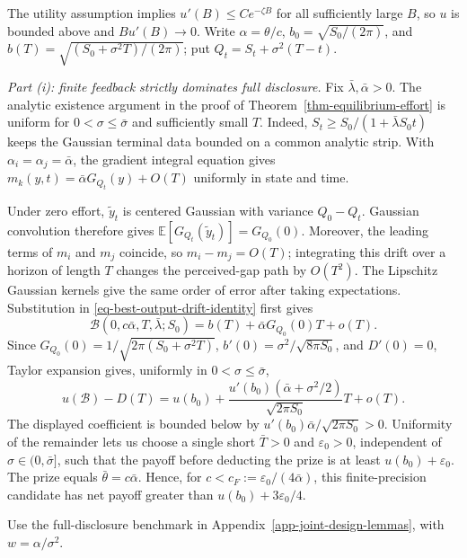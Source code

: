\documentclass[mnsc]{informs3}
\begin{document}
\begin{APPENDICES}
{
The utility assumption implies $u'(B)\leq C e^{-\zeta B}$ for all sufficiently
large $B$, so $u$ is bounded above and $Bu'(B)\to0$.
Write $\alpha=\theta/c$, $b_0=\sqrt{S_0/(2\pi)}$, and
$b(T)=\sqrt{(S_0+\sigma^2T)/(2\pi)}$; put
$Q_t=S_t+\sigma^2(T-t)$.

\emph{Part (i): finite feedback strictly dominates full disclosure.}
Fix $\bar\lambda,\bar\alpha>0$. The analytic existence argument in the
proof of Theorem~\ref{thm-equilibrium-effort} is uniform for
$0<\sigma\leq\bar\sigma$ and sufficiently small $T$.
Indeed, $S_t\geq S_0/(1+\bar\lambda S_0t)$ keeps the Gaussian terminal
data bounded on a common analytic strip. With $\alpha_i=\alpha_j=\bar\alpha$,
the gradient integral equation gives
$m_k(y,t)=\bar\alpha G_{Q_t}(y)+O(T)$ uniformly in state and time.

Under zero effort, $\tilde y_t$ is centered Gaussian with variance
$Q_0-Q_t$. Gaussian convolution therefore gives
$\mathbb E[G_{Q_t}(\tilde y_t)]=G_{Q_0}(0)$. Moreover, the leading terms
of $m_i$ and $m_j$ coincide, so $m_i-m_j=O(T)$; integrating this drift
over a horizon of length $T$ changes the perceived-gap path by $O(T^2)$.
The Lipschitz Gaussian kernels give the same order of error after taking
expectations. Substitution in \eqref{eq-best-output-drift-identity} first
gives
\[
\mathcal B(0,c\bar\alpha,T,\bar\lambda;S_0)
=b(T)+\bar\alpha G_{Q_0}(0)T+o(T).
\]
Since $G_{Q_0}(0)=1/\sqrt{2\pi(S_0+\sigma^2T)}$,
$b'(0)=\sigma^2/\sqrt{8\pi S_0}$, and $D'(0)=0$, Taylor expansion gives,
uniformly in $0<\sigma\leq\bar\sigma$,
\[
u(\mathcal B)-D(T)
=u(b_0)+
\frac{u'(b_0)(\bar\alpha+\sigma^2/2)}{\sqrt{2\pi S_0}}T+o(T).
\]
The displayed coefficient is bounded below by
$u'(b_0)\bar\alpha/\sqrt{2\pi S_0}>0$. Uniformity of the remainder lets
us choose a single short $\bar T>0$ and $\varepsilon_0>0$, independent of
$\sigma\in(0,\bar\sigma]$, such that the payoff before deducting the prize
is at least $u(b_0)+\varepsilon_0$. The prize equals
$\bar\theta=c\bar\alpha$. Hence, for
$c<c_F:=\varepsilon_0/(4\bar\alpha)$, this finite-precision candidate has net
payoff greater than $u(b_0)+3\varepsilon_0/4$.

Use the full-disclosure benchmark in Appendix~\ref{app-joint-design-lemmas},
with $w=\alpha/\sigma^2$.

}
\end{APPENDICES}
\end{document}
